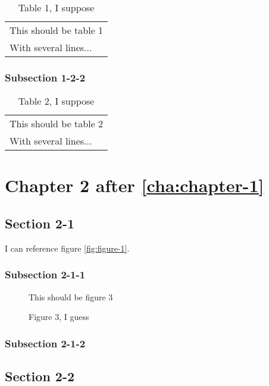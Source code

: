 \documentclass[10pt]{book}
\begin{document}
\begin{table}
  \centering
  \begin{tabular}{l}
    This should be table 1\\
    With several lines...
  \end{tabular}
  \caption{Table 1, I suppose}
  \label{tab:table-1}
\end{table}

\subsection{Subsection 1-2-2}
\label{sec:subsection-1-2-2}

\begin{table}
  \centering
  \begin{tabular}{l}
    This should be table 2\\
    With several lines...
  \end{tabular}
  \caption{Table 2, I suppose}
  \label{tab:table-2}
\end{table}

\chapter{Chapter 2 after \ref{cha:chapter-1}}
\label{cha:chapter-2}
\minitoc
\minilot
\minilof

\section{Section 2-1}
\label{sec:section-2-1}

I can reference figure \ref{fig:figure-1}.

\subsection{Subsection 2-1-1}
\label{sec:subsection-2-1-1}

\begin{figure}
  \centering
  This should be figure 3
  \caption{Figure 3, I guess}
  \label{fig:figure-3}
\end{figure}


\subsection{Subsection 2-1-2}
\label{sec:subsection-2-1-2}

\section{Section 2-2}
\label{sec:section-2-2}
\end{document}
